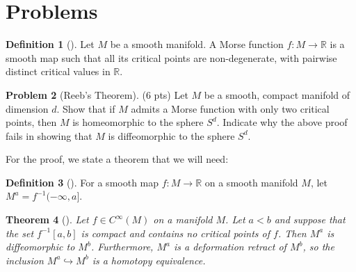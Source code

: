 \documentclass[reqno]{amsart}
\newtheorem{theorem}{Theorem}[section]
\theoremstyle{definition}
\newtheorem{definition}[theorem]{Definition}
\newtheorem{problem}[theorem]{Problem}
\theoremstyle{remark}
\begin{document}
\section{Problems}

\begin{definition}[]
    Let $M$ be a smooth manifold. A Morse function
    $f \colon M \to \mathbb{R}$ is a smooth map such that
    all its critical points are non-degenerate, with
    pairwise distinct critical values in $\mathbb{R}$.
\end{definition}


\begin{problem}[Reeb's Theorem]\label{Reeb's-Theorem}
        (6 pts) Let $M$ be a smooth, compact manifold of
        dimension $d$. Show that if $M$ admits a Morse
        function with only two critical points, then
        $M$ is homeomorphic to the sphere $S^{d}$. Indicate
        why the above proof fails in showing that $M$ is
        diffeomorphic to the sphere $S^{d}$.
    \end{problem}

    For the proof, we state a theorem that we will need:
    \begin{definition}[]
        For a smooth map $f \colon M \to \mathbb{R}$ on a 
        smooth manifold $M$, let
        $M^{a} = f^{-1} (-\infty, a]$.
    \end{definition}

    \begin{theorem}[]\label{Thm1}
        Let $f \in C^{\infty}(M)$ on a manifold $M$.
        Let $a < b$ and suppose that the set
        $f^{-1}\left[ a,b \right] $ is compact and
        contains no critical points of $f$. Then
        $M^{a}$ is diffeomorphic to $M^{b}$. Furthermore,
        $M^{a}$ is a deformation retract of
        $M^{b}$, so the inclusion $M^{a} \hookrightarrow 
        M^{b}$ is a homotopy equivalence.
    \end{theorem}
\end{document}

